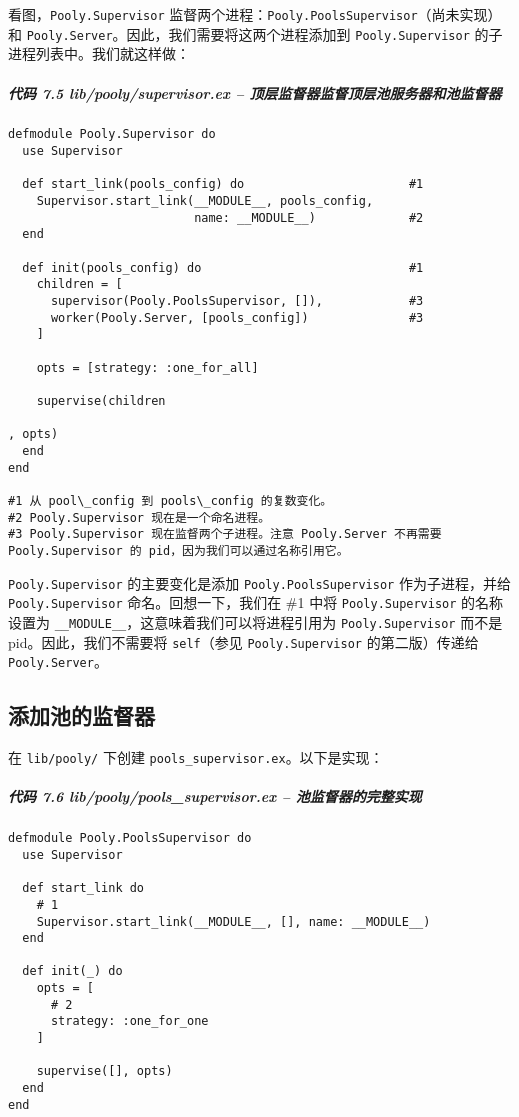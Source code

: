 看图，\texttt{Pooly.Supervisor}
监督两个进程：\texttt{Pooly.PoolsSupervisor}（尚未实现）和
\texttt{Pooly.Server}。因此，我们需要将这两个进程添加到
\texttt{Pooly.Supervisor}
的子进程列表中。我们就这样做：


\subparagraph{代码 7.5 lib/pooly/supervisor.ex --
顶层监督器监督顶层池服务器和池监督器}

\begin{code}{}
\begin{verbatim}
defmodule Pooly.Supervisor do
  use Supervisor

  def start_link(pools_config) do                       #1
    Supervisor.start_link(__MODULE__, pools_config,
                          name: __MODULE__)             #2
  end

  def init(pools_config) do                             #1
    children = [
      supervisor(Pooly.PoolsSupervisor, []),            #3
      worker(Pooly.Server, [pools_config])              #3
    ]

    opts = [strategy: :one_for_all]

    supervise(children

, opts)
  end
end

#1 从 pool\_config 到 pools\_config 的复数变化。
#2 Pooly.Supervisor 现在是一个命名进程。
#3 Pooly.Supervisor 现在监督两个子进程。注意 Pooly.Server 不再需要Pooly.Supervisor 的 pid，因为我们可以通过名称引用它。
\end{verbatim}
\end{code}

\texttt{Pooly.Supervisor} 的主要变化是添加
\texttt{Pooly.PoolsSupervisor} 作为子进程，并给
\texttt{Pooly.Supervisor} 命名。回想一下，我们在 \#1
中将 \texttt{Pooly.Supervisor} 的名称设置为
\texttt{\_\_MODULE\_\_}，这意味着我们可以将进程引用为
\texttt{Pooly.Supervisor} 而不是
pid。因此，我们不需要将 \texttt{self}（参见
\texttt{Pooly.Supervisor} 的第二版）传递给
\texttt{Pooly.Server}。


\subsection{添加池的监督器}

在 \texttt{lib/pooly/} 下创建
\texttt{pools\_supervisor.ex}。以下是实现：


\subparagraph{代码 7.6 lib/pooly/pools\_supervisor.ex --
池监督器的完整实现}

\begin{code}{}
\begin{verbatim}
defmodule Pooly.PoolsSupervisor do
  use Supervisor

  def start_link do
    # 1
    Supervisor.start_link(__MODULE__, [], name: __MODULE__)
  end

  def init(_) do
    opts = [
      # 2
      strategy: :one_for_one
    ]

    supervise([], opts)
  end
end
\end{verbatim}
\end{code}

